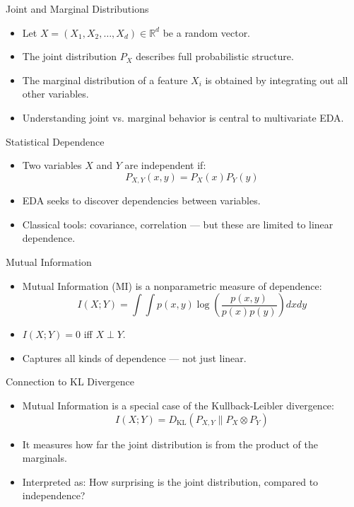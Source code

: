 \documentclass[aspectratio=169]{beamer}
\begin{document}
\begin{frame}[label={sec:org6e473b8}]{Joint and Marginal Distributions}
\begin{itemize}
\item Let \(X = (X_1, X_2, \ldots, X_d) \in \mathbb{R}^d\) be a random
vector.
\item The \alert{joint distribution} \(P_X\) describes full probabilistic
structure.
\item The \alert{marginal distribution} of a feature \(X_i\) is obtained by
integrating out all other variables.
\item Understanding joint vs. marginal behavior is central to multivariate
EDA.
\end{itemize}
\end{frame}

\begin{frame}[label={sec:org5e2b87c}]{Statistical Dependence}
\begin{itemize}
\item Two variables \(X\) and \(Y\) are independent if:
\[
  P_{X,Y}(x, y) = P_X(x) P_Y(y)
  \]
\item EDA seeks to \alert{discover} dependencies between variables.
\item Classical tools: covariance, correlation — but these are limited to
linear dependence.
\end{itemize}
\end{frame}

\begin{frame}[label={sec:org3affee5}]{Mutual Information}
\begin{itemize}
\item Mutual Information (MI) is a nonparametric measure of dependence:
\[
  I(X; Y) = \int \int p(x,y) \log \left( \frac{p(x,y)}{p(x)p(y)} \right) dx dy
  \]
\item \(I(X;Y) = 0\) iff \(X \perp Y\).
\item Captures all kinds of dependence — not just linear.
\end{itemize}
\end{frame}

\begin{frame}[label={sec:orgc6385ee}]{Connection to KL Divergence}
\begin{itemize}
\item Mutual Information is a special case of the \alert{Kullback-Leibler
divergence}:
\[
  I(X;Y) = D_{\mathrm{KL}}(P_{X,Y} \| P_X \otimes P_Y)
  \]
\item It measures how far the joint distribution is from the product of the marginals.
\item Interpreted as: \alert{How surprising is the joint distribution, compared to independence?}
\end{itemize}
\end{frame}
\end{document}
